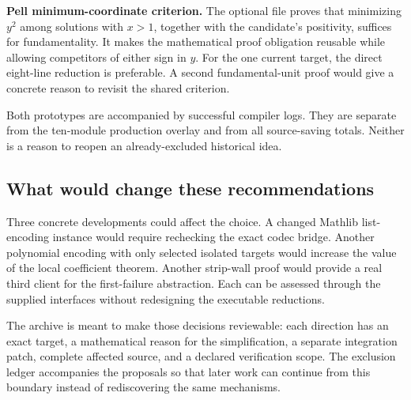 \textbf{Pell minimum-coordinate criterion.} The optional
 file proves that minimizing \(y^2\) among solutions
with \(x>1\), together with the candidate's positivity, suffices for
fundamentality. It makes the mathematical proof obligation reusable while
allowing competitors of either sign in \(y\). For the one current target,
the direct eight-line reduction is preferable. A second fundamental-unit
proof would give a concrete reason to revisit the shared criterion.

Both prototypes are accompanied by successful compiler logs. They are
separate from the ten-module production overlay and from all source-saving
totals. Neither is a reason to reopen an already-excluded historical idea.

\subsection{What would change these recommendations}

Three concrete developments could affect the choice. A changed Mathlib
list-encoding instance would require rechecking the exact codec bridge.
Another polynomial encoding with only selected isolated targets would
increase the value of the local coefficient theorem. Another strip-wall
proof would provide a real third client for the first-failure abstraction.
Each can be assessed through the supplied interfaces without redesigning
the executable reductions.

The archive is meant to make those decisions reviewable: each direction has
an exact target, a mathematical reason for the simplification, a separate
integration patch, complete affected source, and a declared verification
scope. The exclusion ledger accompanies the proposals so that later work can
continue from this boundary instead of rediscovering the same mechanisms.
